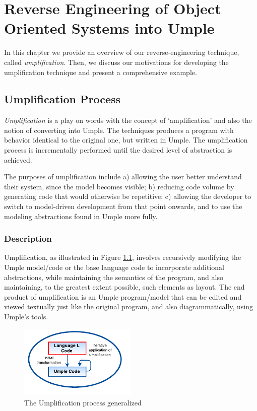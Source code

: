 \lhead{\emph{\leftmark}} 
\chapter{Reverse Engineering of Object Oriented Systems into Umple}
\label{chap:core}

In this chapter we provide an overview of our reverse-engineering technique, called \textit{umplification}. Then, we discuss our motivations for developing the umplification technique and present a comprehensive example. 

\section{Umplification Process}

\textit{Umplification} is a play on words with the concept of `amplification' and also the notion of converting into Umple. The techniques produces a program with behavior identical to the original one, but written in Umple. The umplification process is incrementally performed until the desired level of abstraction is achieved. 

The purposes of umplification include a) allowing the user better understand their system, since the model becomes visible; b) reducing code volume by generating code that would otherwise be repetitive; c) allowing the developer to switch to model-driven development from that point onwards, and to use the modeling abstractions found in Umple more fully.

\subsection{Description}
Umplification, as illustrated in Figure \ref{fig:umplificationLoop}, involves recursively modifying the Umple model/code or the base language code to incorporate additional abstractions, while maintaining the semantics of the program, and also maintaining, to the greatest extent possible, such elements as layout. The end product of umplification is an Umple program/model that can be edited and viewed textually just like the original program, and also diagrammatically, using Umple's tools. 

\begin{figure}[h]
\centering
\includegraphics[width=0.50\textwidth]{Figures/UmplificationProcess.pdf}
\caption{The Umplification process generalized}
\label{fig:umplificationLoop}
\end{figure}

